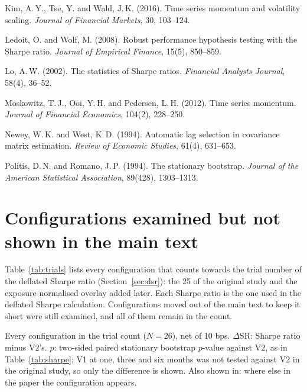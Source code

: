 \documentclass[11pt,a4paper]{article}
\begin{document}
\begin{thebibliography}{99}
Kim, A.\,Y., Tse, Y. and Wald, J.\,K. (2016). Time series momentum and volatility scaling. \textit{Journal of Financial Markets}, 30, 103--124.

Ledoit, O. and Wolf, M. (2008). Robust performance hypothesis testing with the Sharpe ratio. \textit{Journal of Empirical Finance}, 15(5), 850--859.

Lo, A.\,W. (2002). The statistics of Sharpe ratios. \textit{Financial Analysts Journal}, 58(4), 36--52.

Moskowitz, T.\,J., Ooi, Y.\,H. and Pedersen, L.\,H. (2012). Time series momentum. \textit{Journal of Financial Economics}, 104(2), 228--250.

Newey, W.\,K. and West, K.\,D. (1994). Automatic lag selection in covariance matrix estimation. \textit{Review of Economic Studies}, 61(4), 631--653.

Politis, D.\,N. and Romano, J.\,P. (1994). The stationary bootstrap. \textit{Journal of the American Statistical Association}, 89(428), 1303--1313.

\end{thebibliography}

\appendix
\renewcommand{\thetable}{A\arabic{table}}
\renewcommand{\thefigure}{A\arabic{figure}}
\setcounter{table}{0}
\setcounter{figure}{0}

\section{Configurations examined but not shown in the main text}
\label{app:trials}

Table~\ref{tab:trials} lists every configuration that counts towards the trial number of the deflated Sharpe ratio (Section~\ref{sec:dsr}): the 25 of the original study and the exposure-normalised overlay added later. Each Sharpe ratio is the one used in the deflated Sharpe calculation. Configurations moved out of the main text to keep it short were still examined, and all of them remain in the count.

\begin{table}[!htbp]
\centering
\caption{Every configuration in the trial count ($N = 26$), net of 10 bps. $\Delta$SR: Sharpe ratio minus V2's. $p$: two-sided paired stationary bootstrap $p$-value against V2, as in Table~\ref{tab:sharpe}; V1 at one, three and six months was not tested against V2 in the original study, so only the difference is shown. Also shown in: where else in the paper the configuration appears.}
\label{tab:trials}
\small

\end{table}
\end{document}
